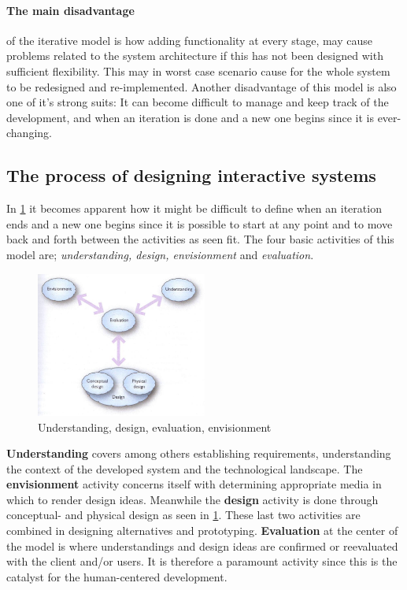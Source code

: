 \paragraph{The main disadvantage} of the iterative model is how adding functionality at every stage, may cause problems related to the system architecture 
if this has not been designed with sufficient flexibility.
This may in worst case scenario cause for the whole system to be redesigned and re-implemented.
Another disadvantage of this model is also one of it's strong suits:
It can become difficult to manage and keep track of the development, and when an iteration is done and a new one begins since it is ever-changing.

\subsection{The process of designing interactive systems}\label{sec:Iterative1}
In \cref{fig:DEBModel} it becomes apparent how it might be difficult to define when an iteration ends and a new one begins since it is possible to start at any point and to move back and forth between the activities as seen fit.
The four basic activities of this model are; \textit{understanding, design, envisionment} and \textit{evaluation}.

\begin{figure}[H]
	\centering
	\includegraphics[width=0.5\textwidth]{billeder/DEBModel.jpg}
	\caption{Understanding, design, evaluation, envisionment \citep[p.~49]{Benyon}}\label{fig:DEBModel}
\end{figure}

\textbf{Understanding} covers among others establishing requirements, understanding the context of the developed system and the technological landscape.
The \textbf{envisionment} activity concerns itself with determining appropriate media in which to render design ideas.
Meanwhile the \textbf{design} activity is done through conceptual- and physical design as seen in \cref{fig:DEBModel}.
These last two activities are combined in designing alternatives and prototyping.
\textbf{Evaluation} at the center of the model is where understandings and design ideas are confirmed or reevaluated with the client and/or users.
It is therefore a paramount activity since this is the catalyst for the human-centered development.

